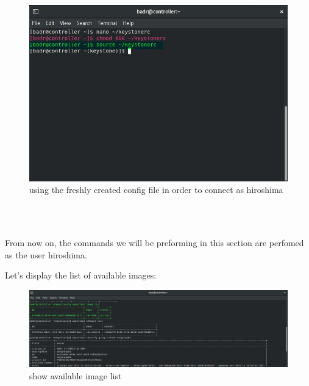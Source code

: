 \begin{spacing}{1.2}
\begin{figure}[!htb]
\begin{center}
\includegraphics[width=1\linewidth]{Cloud/Creating and Running Instances/chmod and source} 
\end{center} 
\caption{using the freshly created config file in order to connect as hiroshima} 
\end{figure} 
\FloatBarrier
\\


\\
\par From now on, the commands we will be preforming in this section are perfomed as the user hiroshima.
\\
\par Let's display the list of available images: 
\\
\begin{figure}[!htb] 
\begin{center} 
\includegraphics[width=1\linewidth]{Cloud/Creating and Running Instances/show available image list} 
\end{center} 
\caption{show available image list} 
\end{figure} 
\FloatBarrier


\end{spacing}
